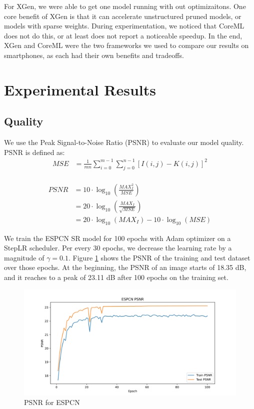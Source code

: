 \documentclass{article}
\begin{document}
For XGen, we were able to get one model running with out optimizaitons. One core benefit of XGen is that it can accelerate unstructured pruned models, or models with sparse weights. During experimentation, we noticed that CoreML does not do this, or at least does not report a noticeable speedup. In the end, XGen and CoreML were the two frameworks we used to compare our results on smartphones, as each had their own benefits and tradeoffs.



\section{Experimental Results}
\subsection{Quality}
We use the Peak Signal-to-Noise Ratio (PSNR) to evaluate our model quality. PSNR is defined as:
\begin{equation}
	\begin{split}
		MSE &= \frac{1}{m n} \sum_{i=0}^{m-1} \sum_{j=0}^{n-1}[I(i, j)-K(i, j)]^2 \\
	\end{split}
\end{equation}


\begin{equation}
	\begin{split}
		PSNR &=10 \cdot \log _{10}\left(\frac{M A X_I^2}{M S E}\right) \\
		&=20 \cdot \log _{10}\left(\frac{M A X_I}{\sqrt{M S E}}\right) \\
		&=20 \cdot \log _{10}\left(M A X_I\right)-10 \cdot \log _{10}(M S E)
	\end{split}
\end{equation}

We train the ESPCN SR model for 100 epochs with Adam optimizer on a StepLR scheduler. Per every 30 epochs, we decrease the learning rate by a magnitude of $\gamma=0.1$. Figure \ref{fig:psnr} shows the PSNR of the training and test dataset over those epochs. At the beginning, the PSNR of an image starts of 18.35 dB, and it reaches to a peak of 23.11 dB after 100 epochs on the training set.

\begin{figure}
	\centerline{\includegraphics[width=6in]{../final/figures/SuperResolutionTwitter_PSNR.png}}
	\caption{PSNR for ESPCN}
	\label{fig:psnr}
\end{figure}
\end{document}
